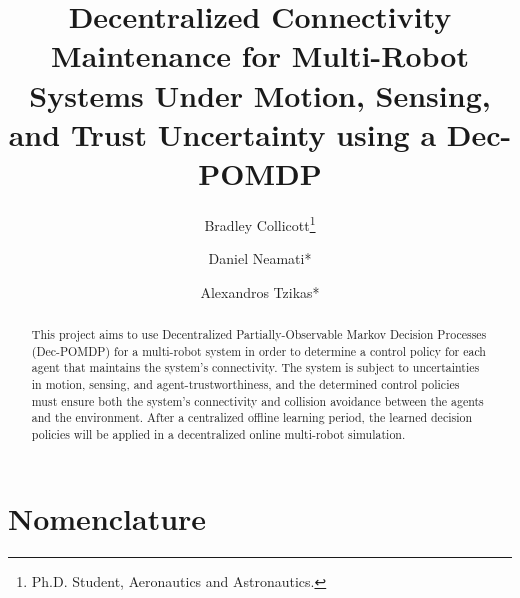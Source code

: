 \documentclass[conf]{new-aiaa}
\title{Decentralized Connectivity Maintenance for Multi-Robot Systems Under Motion, Sensing, and Trust Uncertainty using a Dec-POMDP}
\author{Bradley Collicott\footnote{Ph.D. Student, Aeronautics and Astronautics.}}
\author{Daniel Neamati*}
\author{Alexandros Tzikas*}
\affil{Stanford University, Stanford, CA, 94305, United States}
\begin{document}
\maketitle

\begin{abstract}
This project aims to use Decentralized Partially-Observable Markov Decision Processes (Dec-POMDP) for a multi-robot system in order to determine a control policy for each agent that maintains the system's connectivity. The system is subject to uncertainties in motion, sensing, and agent-trustworthiness, and the determined control policies must ensure both the system's connectivity and collision avoidance between the agents and the environment. After a centralized offline learning period, the learned decision policies will be applied in a decentralized online multi-robot simulation.
\end{abstract}

\section{Nomenclature}
\end{document}
